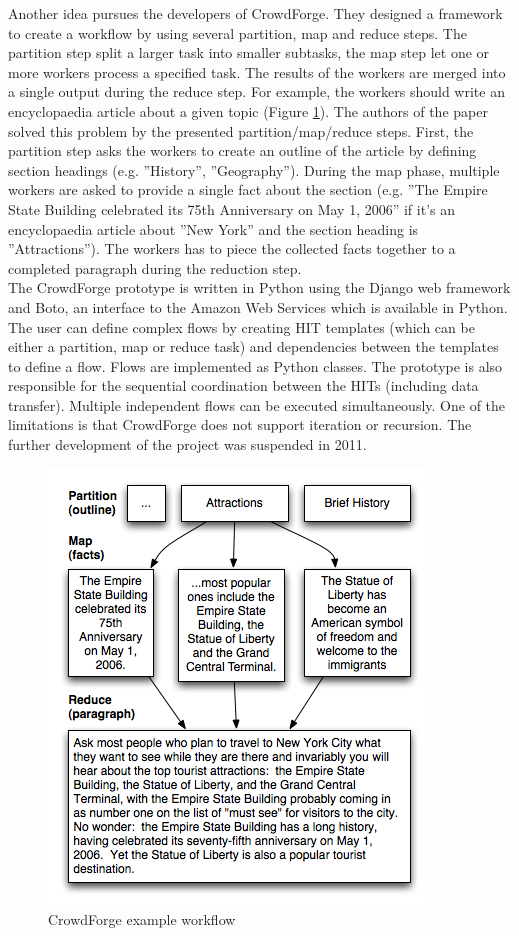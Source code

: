 Another idea pursues the developers of CrowdForge\cite{crowdforge}. They designed a framework to create a workflow by using several partition, map and reduce steps. The partition step split a larger task into smaller subtasks, the map step let one or more workers process a specified task. The results of the workers are merged into a single output during the reduce step. For example, the workers should write an encyclopaedia article about a given topic (Figure \ref{crowdforgeflow}). The authors of the paper solved this problem by the presented partition/map/reduce steps. First, the partition step asks the workers to create an outline of the article by defining section headings (e.g. ''History'', ''Geography''). During the map phase, multiple workers are asked to provide a single fact about the section (e.g. ''The Empire State Building celebrated its 75th Anniversary on May 1, 2006'' if it's an encyclopaedia article about ''New York'' and the section heading is ''Attractions''). The workers has to piece the collected facts together to a completed paragraph during the reduction step.\\
The CrowdForge prototype is written in Python using the Django web framework and Boto, an interface to the Amazon Web Services which is available in Python. The user can define complex flows by creating HIT templates (which can be either a partition, map or reduce task) and dependencies between the templates to define a flow. Flows are implemented as Python classes. The prototype is also responsible for the sequential coordination between the HITs (including data transfer). Multiple independent flows can be executed simultaneously. One of the limitations is that CrowdForge does not support iteration or recursion. The further development of the project was suspended in 2011.
\begin{figure}
\centering
\includegraphics[scale=0.5]{images/crowdforge-article.png}
\caption{CrowdForge example workflow}
\label{crowdforgeflow}
\end{figure}

